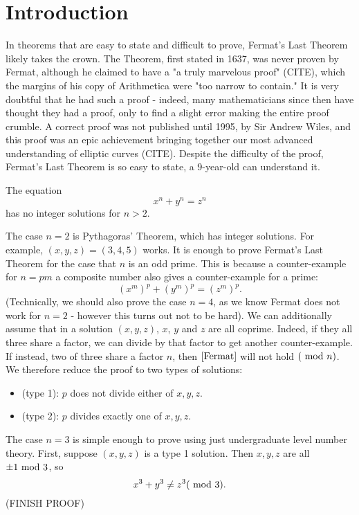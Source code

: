 \chapter{Introduction}
In theorems that are easy to state and difficult to prove, Fermat's Last Theorem likely takes the crown. The Theorem, first stated in 1637, was never proven by Fermat, although he claimed to have a "a truly marvelous proof" (CITE), which the margins of his copy of Arithmetica were "too narrow to contain." It is very doubtful that he had such a proof - indeed, many mathematicians since then have thought they had a proof, only to find a slight error making the entire proof crumble. A correct proof was not published until 1995, by Sir Andrew Wiles, and this proof was an epic achievement bringing together our most advanced understanding of elliptic curves (CITE). Despite the difficulty of the proof, Fermat's Last Theorem is so easy to state, a 9-year-old can understand it.

\begin{theorem}[Fermat]
The equation
\begin{equation}\label{Fermat}
    x^n+y^n=z^n
\end{equation}
has no integer solutions for $n>2$.
\end{theorem}

The case $n=2$ is Pythagoras' Theorem, which has integer solutions. For example, $(x,y,z)=(3,4,5)$ works. It is enough to prove Fermat's Last Theorem for the case that $n$ is an odd prime. This is because a counter-example for $n=pm$ a composite number also gives a counter-example for a prime:
$$(x^m)^p+(y^m)^p=(z^m)^p.$$
(Technically, we should also prove the case $n=4$, as we know Fermat does not work for $n=2$ - however this turns out not to be hard). We can additionally assume that in a solution $(x,y,z)$, $x$, $y$ and $z$ are all coprime. Indeed, if they all three share a factor, we can divide by that factor to get another counter-example. If instead, two of three share a factor $n$, then $\cref{Fermat}$ will not hold $(\ \mathrm{mod}\ n)$. We therefore reduce the proof to two types of solutions:
\begin{itemize}
    \item (type 1): $p$ does not divide either of $x,y,z$.
    \item (type 2): $p$ divides exactly one of $x,y,z$.
\end{itemize}

The case $n=3$ is simple enough to prove using just undergraduate level number theory. First, suppose $(x,y,z)$ is a type 1 solution. Then $x,y,z$ are all $\pm1 \ \mathrm{mod}\ 3$, so $$x^3+y^3\neq z^3 (\ \mathrm{mod}\ 3).$$
(FINISH PROOF)

